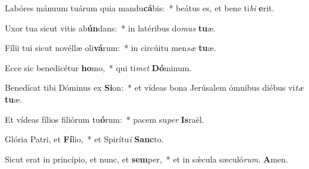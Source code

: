 Labóres mánuum tuárum quia mandu\textbf{cá}bis:~* beátus es, et bene ti\textit{bi} \textbf{e}rit.

Uxor tua sicut vitis ab\textbf{ún}dans:~* in latéribus do\textit{mus} \textbf{tu}æ.

Fílii tui sicut novéllæ oli\textbf{vá}rum:~* in circúitu men\textit{sæ} \textbf{tu}æ.

Ecce sic benedicétur \textbf{ho}mo,~* qui ti\textit{met} \textbf{Dó}minum.

Benedícat tibi Dóminus ex \textbf{Si}on:~* et vídeas bona Jerúsalem ómnibus diébus vi\textit{tæ} \textbf{tu}æ.

Et vídeas fílios filiórum tu\textbf{ó}rum:~* pacem su\textit{per} \textbf{Is}raël.

Glória Patri, et \textbf{Fí}lio,~* et Spirítu\textit{i} \textbf{Sanc}to.

Sicut erat in princípio, et nunc, et \textbf{sem}per,~* et in sǽcula sæculó\textit{rum}. \textbf{A}men.

